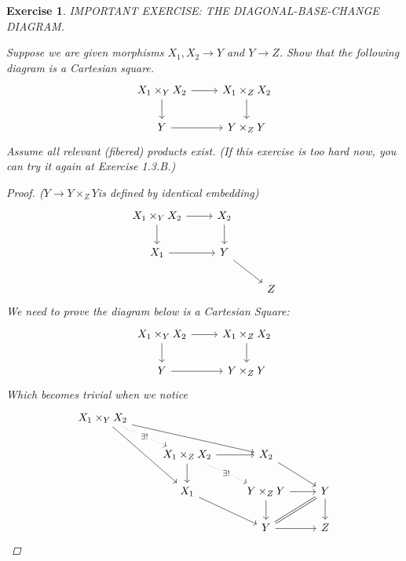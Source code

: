\documentclass{article}
\theoremstyle{breakstyle}
\newtheorem{exercise}{Exercise}[section]
\begin{document}
\begin{exercise}
IMPORTANT EXERCISE: THE DIAGONAL-BASE-CHANGE DIAGRAM.

Suppose we are given morphisms $X_{1}, X_{2} \rightarrow Y$ and
$Y \rightarrow Z$. Show that the following diagram is a Cartesian square.
$$
\begin{tikzcd}
    X_1\times_Y X_2 \arrow[r] \arrow[d] & X_1\times_Z X_2 \arrow[d] \\
    Y \arrow[r] & Y\times_Z Y
\end{tikzcd}
$$
Assume all relevant (fibered) products exist. (If this exercise is too hard
now, you can try it again at Exercise 1.3.B.)

\begin{proof}
    \emph{(}$ Y\longrightarrow Y\times _{Z}Y $\emph{is defined by identical
    embedding)}
	$$
	\begin{tikzcd}
X_1\times_Y X_2 \arrow[d] \arrow[r] & X_2 \arrow[d] &   \\
X_1 \arrow[r]                       & Y \arrow[rd]  &   \\
                                    &               & Z
	\end{tikzcd}
	$$ 
	We need to prove the diagram below is a Cartesian Square:
	$$
	\begin{tikzcd}
        X_1\times_Y X_2 \arrow[d] \arrow[r] & X_1\times_Z X_2 \arrow[d] \\
        Y \arrow[r]                         & Y\times_Z Y              
	\end{tikzcd}
	$$ 
    Which becomes trivial when we notice
    $$
    \begin{tikzcd}
        X_1\times_{Y}X_2 \arrow[rd, "\exists!" description, dotted] \arrow[rrd] \arrow[rdd] &                                                                                 &                                             &             \\
                                                                                        & X_1\times_{Z}X_2 \arrow[rd, "\exists!" description, dotted] \arrow[d] \arrow[r] & X_2 \arrow[rd]                              &             \\
                                                                                        & X_1 \arrow[rd]                                                                  & Y\times_{Z}Y \arrow[d] \arrow[r]            & Y \arrow[d] \\
                                                                                        &                                                                                 & Y \arrow[ru, Rightarrow,no head] \arrow[r] & Z          
    \end{tikzcd}
    $$
\end{proof}

\end{exercise}
\end{document}
